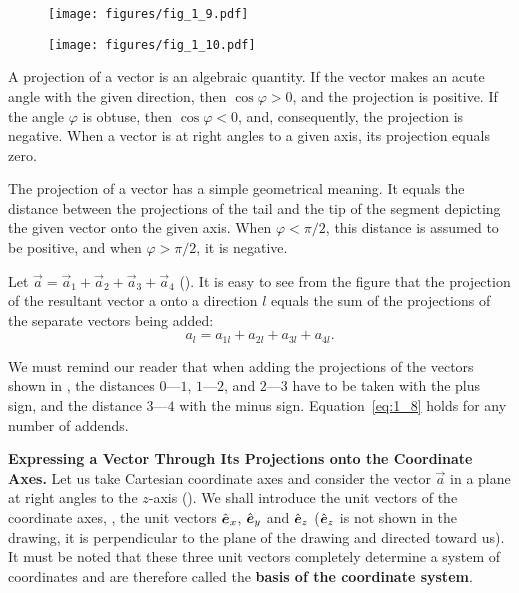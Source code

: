 \begin{figure}[t]
	\begin{minipage}[t]{0.5\linewidth}
		\begin{center}
			\texttt{[image: figures/fig\_1\_9.pdf]}
			\caption[]{}
			\label{fig:1_9}
		\end{center}
	\end{minipage}
	\hfill{ }%
	\begin{minipage}[t]{0.5\linewidth}
		\begin{center}
			\texttt{[image: figures/fig\_1\_10.pdf]}
			\caption[]{}
			\label{fig:1_10}
		\end{center}
	\end{minipage}
	\vspace{-0.7cm}
\end{figure}

A projection of a vector is an algebraic quantity. If the vector makes an acute angle with the given direction, then $\cos\varphi>0$, and the projection is positive. If the angle $\varphi$ is obtuse, then $\cos\varphi<0$, and, consequently, the projection is negative. When a vector is at right angles to a given axis, its projection equals zero.

The projection of a vector has a simple geometrical meaning. It equals the distance between the projections of the tail and the tip of the segment depicting the given vector onto the given axis. When $\varphi<\pi/2$, this distance is assumed to be positive, and when $\varphi>\pi/2$, it is negative.

Let $\vec{a} = \vec{a}_1+\vec{a}_2+\vec{a}_3+\vec{a}_4$ (). It is easy to see from the figure that the projection of the resultant vector a onto a direction $l$ equals the sum of the projections of the separate vectors being added:
\begin{equation}\label{eq:1_8}
a_l = a_{1l}+a_{2l}+a_{3l}+a_{4l}.
\end{equation}

\noindent
We must remind our reader that when adding the projections of the vectors shown in , the distances $0$---$1$, $1$---$2$, and $2$---$3$ have to be taken with the plus sign, and the distance $3$---$4$ with the minus sign. Equation~\eqref{eq:1_8} holds for any number of addends.

\textbf{Expressing a Vector Through Its Projections onto the Coordinate Axes.} Let us take Cartesian coordinate axes and consider the vector $\vec{a}$ in a plane at right angles to the $z$-axis (). We shall introduce the unit vectors of the coordinate axes, \ie, the unit vectors $\hat{\boldsymbol{e}}_{x}$, $\hat{\boldsymbol{e}}_{y}$ and $\hat{\boldsymbol{e}}_{z}$ ($\hat{\boldsymbol{e}}_{z}$ is not shown in the drawing, it is perpendicular to the plane of the drawing and directed toward us). It must be noted that these three unit vectors completely determine a system of coordinates and are therefore called the \textbf{basis of the coordinate system}.


